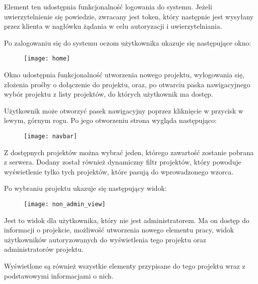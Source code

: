 \documentclass[11pt, titlepage]{article}
\begin{document}
Element ten udostępnia funkcjonalność logowania do systemu. Jeżeli uwierzytelnienie się powiedzie, zwracany jest token, który następnie jest wysyłany przez klienta w nagłówku żądania w celu autoryzacji i uwierzytelniania.

\break

Po zalogowaniu się do systemu oczom użytkownika ukazuje się następujące okno:

\begin{figure}[H]
\begin{adjustwidth}{-3cm}{}
\texttt{[image: home]}
\end{adjustwidth}
\end{figure}

Okno udostępnia funkcjonalność utworzenia nowego projektu, wylogowania się, złożenia prośby o dołączenie do projektu, oraz, po otwarciu paska nawigacyjnego wybór projektu z listy projektów, do których użytkownik ma dostęp.

\break

Użytkownik może otworzyć pasek nawigacyjny poprzez kliknięcie w przycisk w lewym, górnym rogu. Po jego otworzeniu strona wygląda następująco:

\begin{figure}[H]
\begin{adjustwidth}{-3cm}{}
\texttt{[image: navbar]}
\end{adjustwidth}
\end{figure}

Z dostępnych projektów można wybrać jeden, którego zawartość zostanie pobrana z serwera. Dodany został również dynamiczny filtr projektów, który powoduje wyświetlenie tylko tych projektów, które pasują do wprowadzonego wzorca.

\break

Po wybraniu projektu ukazuje się następujący widok:

\begin{figure}[H]
\begin{adjustwidth}{-3cm}{}
\texttt{[image: non\_admin\_view]}
\end{adjustwidth}
\end{figure}

Jest to widok dla użytkownika, który nie jest administratorem. Ma on dostęp do informacji o projekcie, możliwość utworzenia nowego elementu pracy, widok użytkowników autoryzowanych do wyświetlenia tego projektu oraz administratorów projektu.

Wyświetlone są również wszystkie elementy przypisane do tego projektu wraz z podstawowymi informacjami o nich.
\end{document}
